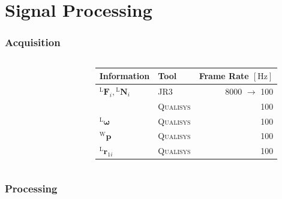\documentclass[student,noshadow]{ITRslides}
\renewcommand{\vec}[1]{\boldsymbol{#1}}
\renewcommand{\vec}[1]{\boldsymbol{#1}}
\newcommand{\scr}[1]{\mathrm{#1}}
\begin{document}
\section{Signal Processing}
\begin{frame}
	\frametitle{Acquisition}
	\begin{columns}
	\begin{column}{0.35\textwidth}
				\begin{figure}
					\centering
					
				\end{figure}	
		 	\end{column}
		 	\begin{column}{0.65\textwidth}
		 	\begin{tabular}{llr}
				\toprule
				Information    & Tool & Frame Rate $\left[\mathrm{Hz}\right]$ \\
				\midrule
				${^\scr{L}}\vec{F}_{i},{^\scr{L}}\vec{N}_{i}$      & \textsc{JR3}    & 8000 $\rightarrow$ 100      \\
				          & \textsc{Qualisys}        & 100       \\
				$^\scr{L}\vec{\omega}$       & \textsc{Qualisys}     & 100      \\
				$^\scr{W}\vec{p}$       & \textsc{Qualisys}     & 100      \\
				$^\scr{L}\vec{r}_{1i}$ & \textsc{Qualisys}      & 100       \\
				\bottomrule
			\end{tabular}
		 	\end{column}
	\end{columns}
\end{frame}

\begin{frame}
	\frametitle{Processing}
\end{frame}
\end{document}
